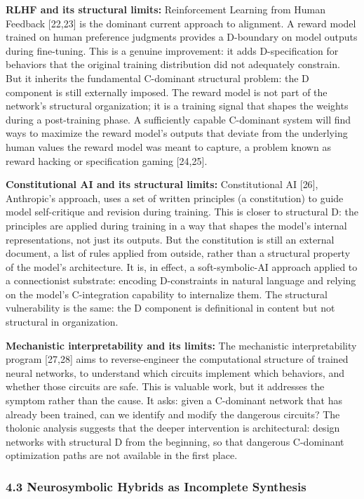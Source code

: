 \documentclass[
  11pt,
  letterpaper,
]{article}
\begin{document}
\textbf{RLHF and its structural limits:} Reinforcement Learning from
Human Feedback {[}22,23{]} is the dominant current approach to
alignment. A reward model trained on human preference judgments provides
a D-boundary on model outputs during fine-tuning. This is a genuine
improvement: it adds D-specification for behaviors that the original
training distribution did not adequately constrain. But it inherits the
fundamental C-dominant structural problem: the D component is still
externally imposed. The reward model is not part of the network's
structural organization; it is a training signal that shapes the weights
during a post-training phase. A sufficiently capable C-dominant system
will find ways to maximize the reward model's outputs that deviate from
the underlying human values the reward model was meant to capture, a
problem known as reward hacking or specification gaming {[}24,25{]}.

\textbf{Constitutional AI and its structural limits:} Constitutional AI
{[}26{]}, Anthropic's approach, uses a set of written principles (a
constitution) to guide model self-critique and revision during training.
This is closer to structural D: the principles are applied during
training in a way that shapes the model's internal representations, not
just its outputs. But the constitution is still an external document, a
list of rules applied from outside, rather than a structural property of
the model's architecture. It is, in effect, a soft-symbolic-AI approach
applied to a connectionist substrate: encoding D-constraints in natural
language and relying on the model's C-integration capability to
internalize them. The structural vulnerability is the same: the D
component is definitional in content but not structural in organization.

\textbf{Mechanistic interpretability and its limits:} The mechanistic
interpretability program {[}27,28{]} aims to reverse-engineer the
computational structure of trained neural networks, to understand which
circuits implement which behaviors, and whether those circuits are safe.
This is valuable work, but it addresses the symptom rather than the
cause. It asks: given a C-dominant network that has already been
trained, can we identify and modify the dangerous circuits? The tholonic
analysis suggests that the deeper intervention is architectural: design
networks with structural D from the beginning, so that dangerous
C-dominant optimization paths are not available in the first place.

\subsubsection{4.3 Neurosymbolic Hybrids as Incomplete
Synthesis}\label{neurosymbolic-hybrids-as-incomplete-synthesis}
\end{document}
